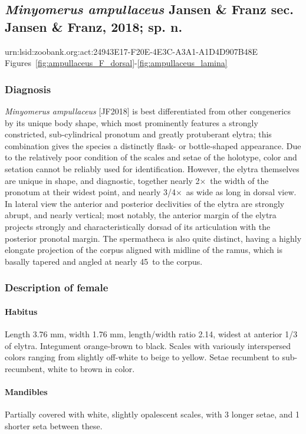 \documentclass[fleqn,10pt,lineno]{wlpeerj} %
\newcommand{\td}{\textdegree~}
\newcommand{\x}{$\times$~}
\begin{document}
	\subsection*{\textit{Minyomerus ampullaceus} Jansen \& Franz sec. Jansen \& Franz, 2018; sp. n.}\label{ssec:amp}
		urn:lsid:zoobank.org:act:24943E17-F20E-4E3C-A3A1-A1D4D907B48E\\
		Figures~\ref{fig:ampullaceus_F_dorsal}-\ref{fig:ampullaceus_lamina}
		\subsubsection*{Diagnosis}
			\textit{Minyomerus ampullaceus} [JF2018] is best differentiated from other congenerics by its unique body shape, which most prominently features a strongly constricted, sub-cylindrical pronotum and greatly protuberant elytra; this combination gives the species a distinctly flask- or bottle-shaped appearance.
			Due to the relatively poor condition of the scales and setae of the holotype, color and setation cannot be reliably used for identification.
			However, the elytra themselves are unique in shape, and diagnostic, together nearly 2\x the width of the pronotum at their widest point, and nearly 3/4\x as wide as long in dorsal view.
			In lateral view the anterior and posterior declivities of the elytra are strongly abrupt, and nearly vertical; most notably, the anterior margin of the elytra projects strongly and characteristically dorsad of its articulation with the posterior pronotal margin.
			The spermatheca is also quite distinct, having a highly elongate projection of the corpus aligned with midline of the ramus, which is basally tapered and angled at nearly 45\td to the corpus.
		\subsubsection*{Description of female}
			\paragraph{Habitus}
				Length 3.76 mm, width 1.76 mm, length/width ratio 2.14, widest at anterior 1/3 of elytra.
				Integument orange-brown to black. 
				Scales with variously interspersed colors ranging from slightly off-white to beige to yellow. 
				Setae recumbent to sub-recumbent, white to brown in color.
			\paragraph{Mandibles}
				Partially covered with white, slightly opalescent scales, with 3 longer setae, and 1 shorter seta between these.
\end{document}
